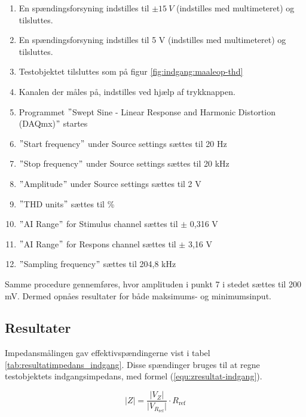 \begin{enumerate}
\item En spændingsforsyning indstilles til $\pm15~V$ (indstilles med multimeteret) og tilsluttes.
\item En spændingsforsyning indstilles til 5 V (indstilles med multimeteret) og tilsluttes.
\item Testobjektet tilsluttes som på figur \ref{fig:indgang:maaleop-thd}
\item Kanalen der måles på, indstilles ved hjælp af trykknappen.
\item Programmet $"$Swept Sine - Linear Response and Harmonic Distortion (DAQmx)$"$ startes
\item $"$Start frequency$"$ under Source settings sættes til 20 Hz
\item $"$Stop frequency$"$ under Source settings sættes til 20 kHz
\item $"$Amplitude$"$ under Source settings sættes til 2 V
\item $"$THD units$"$ sættes til \%
\item $"$AI Range$"$ for Stimulus channel sættes til $\pm$ 0,316 V
\item $"$AI Range$"$ for Respons channel sættes til $\pm$ 3,16 V
\item $"$Sampling frequency$"$ sættes til 204,8 kHz
\end{enumerate}

Samme procedure gennemføres, hvor amplituden i punkt 7 i stedet sættes til 200 mV. Dermed opnåes resultater for både maksimums- og minimumsinput. 

\subsection*{Resultater}
\label{maalejournal_resultater}


Impedansmålingen gav effektivspændingerne vist i tabel \ref{tab:resultatimpedans_indgang}. Disse spændinger bruges til at regne testobjektets indgangsimpedans, med formel (\ref{equ:zresultat-indgang}).

\begin{equation}
\label{equ:zresultat-indgang}
\vert Z \vert = \frac{\vert V_Z \vert}{\vert V_{R_\mathrm{ref}} \vert} \cdot R_\mathrm{ref}
\end{equation} 

